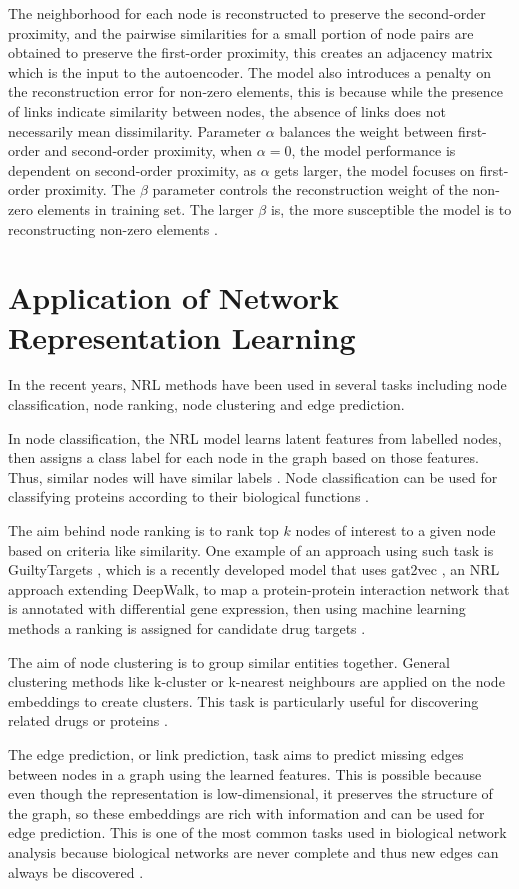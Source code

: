 The neighborhood for each node is reconstructed to preserve the second-order proximity, and the pairwise similarities for a small portion of node pairs are obtained to preserve the first-order proximity, this creates an adjacency matrix which is the input to the autoencoder. The model also introduces a penalty on the reconstruction error for non-zero elements, this is because while the presence of links indicate similarity between nodes, the absence of links does not necessarily mean dissimilarity. Parameter $\alpha$ balances the weight between first-order and second-order proximity, when $\alpha=0$, the model performance is dependent on second-order proximity, as $\alpha$ gets larger, the model focuses on first-order proximity. The $\beta$ parameter controls the reconstruction weight of the non-zero elements in training set. The larger $\beta$ is, the more susceptible the model is to reconstructing non-zero elements \cite{wang_structural_2016}.

\section{Application of Network Representation Learning}
In the recent years, \ac{NRL} methods have been used in several tasks including node classification, node ranking, node clustering and edge prediction.

In node classification, the \ac{NRL} model learns latent features from labelled nodes, then assigns a class label for each node in the graph based on those features. Thus, similar nodes will have similar labels \cite{cui_survey_2017}. Node classification can be used for classifying proteins according to their biological functions \cite{grover_node2vec:_2016}.

The aim behind node ranking is to rank top $k$ nodes of interest to a given node based on criteria like similarity. One example of an approach using such task is GuiltyTargets \cite{muslu_guiltytargets:_2019}, which is a recently developed model that uses gat2vec \cite{sheikh_gat2vec:_2018}, an \ac{NRL} approach extending DeepWalk, to map a protein-protein interaction network that is annotated with differential gene expression, then using machine learning methods a ranking is assigned for candidate drug targets \cite{muslu_guiltytargets:_2019}.

The aim of node clustering is to group similar entities together. General clustering methods like k-cluster or k-nearest neighbours are applied on the node embeddings to create clusters. This task is particularly useful for discovering related drugs or proteins \cite{hamilton_representation_nodate}.

The edge prediction, or link prediction, task aims to predict missing edges between nodes in a graph using the learned features. This is possible because even though the representation is low-dimensional, it preserves the structure of the graph, so these embeddings are rich with information and can be used for edge prediction. This is one of the most common tasks used in biological network analysis because biological networks are never complete and thus new edges can always be discovered \cite{hamilton_representation_nodate}. 
